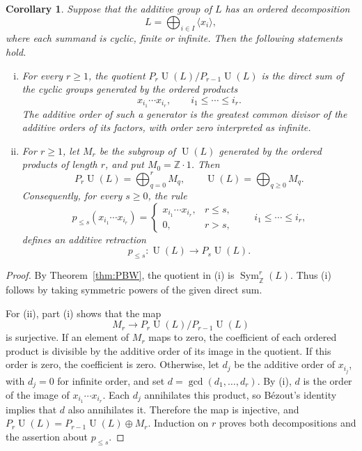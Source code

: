 \documentclass[a4paper,11pt,reqno]{amsart}
\newtheorem{corollary}[theorem]{Corollary}
\theoremstyle{definition}
\newcommand{\Z}{\mathbb Z}
\newcommand{\U}{\operatorname U}
\newcommand{\Sym}{\operatorname{Sym}}
\begin{document}
\begin{corollary}\label{cor:PBW-collection}
Suppose that the additive group of $L$ has an ordered decomposition
\[
 L=\bigoplus_{i\in I}\langle x_i\rangle,
\]
where each summand is cyclic, finite or infinite.  Then
the following statements hold.
\begin{enumerate}[(i)]
 \item For every $r\geq1$, the quotient
 $P_r\U(L)/P_{r-1}\U(L)$ is the direct sum of the cyclic groups generated
 by the ordered products
 \[
  x_{i_1}\cdots x_{i_r},
                         \qquad i_1\leq\cdots\leq i_r.
 \]
 The additive order of such a generator is the greatest common divisor of
 the additive orders of its factors, with order zero interpreted as
 infinite.
 \item For $r\geq1$, let $M_r$ be the subgroup of $\U(L)$ generated by
 the ordered products of length $r$, and put $M_0=\Z\cdot1$.  Then
 \[
  P_r\U(L)=\bigoplus_{q=0}^r M_q,
  \qquad
  \U(L)=\bigoplus_{q\geq0}M_q.
 \]
 Consequently, for every $s\geq0$, the rule
 \[
  p_{\leq s}(x_{i_1}\cdots x_{i_r})=
  \begin{cases}
   x_{i_1}\cdots x_{i_r},&r\leq s,\\
   0,&r>s,
  \end{cases}
  \qquad i_1\leq\cdots\leq i_r,
 \]
 defines an additive retraction
 \[
                     p_{\leq s}:\U(L)\longrightarrow P_s\U(L).
 \]
\end{enumerate}
\end{corollary}

\begin{proof}
By Theorem~\ref{thm:PBW}, the quotient in (i) is $\Sym^r_{\Z}(L)$.
Thus (i) follows by taking symmetric powers of the given direct sum.

For (ii), part (i) shows that the map
\[
                      M_r\longrightarrow P_r\U(L)/P_{r-1}\U(L)
\]
is surjective.  If an element of $M_r$ maps to zero, the coefficient of
each ordered product is divisible by the additive order of its image in
the quotient.  If this order is zero, the coefficient is zero.  Otherwise,
let $d_j$ be the additive order of $x_{i_j}$, with $d_j=0$ for infinite
order, and set $d=\gcd(d_1,\ldots,d_r)$.  By (i), $d$ is the order of the
image of $x_{i_1}\cdots x_{i_r}$.  Each $d_j$ annihilates this product, so
B\'ezout's identity implies that $d$ also annihilates it.  Therefore the
map is injective, and
$P_r\U(L)=P_{r-1}\U(L)\oplus M_r$.  Induction on $r$ proves both
decompositions and the assertion about $p_{\leq s}$.
\end{proof}
\end{document}
